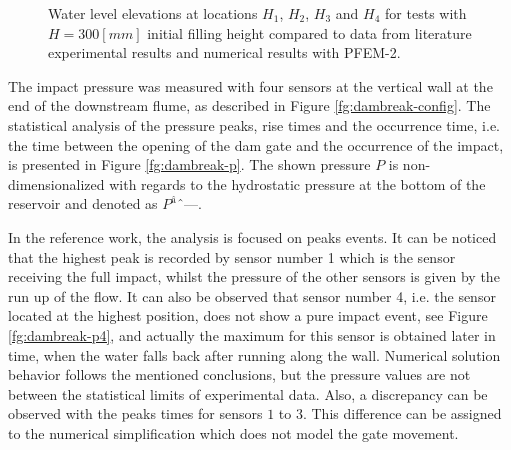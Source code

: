 \begin{figure}[h]
{    }
   \caption{Water level elevations at locations $H_1$, $H_2$, $H_3$ and $H_4$ for tests with $H=300[mm]$ initial filling height compared to data from literature experimental results\cite{Lobovsky13} and numerical results with PFEM-2.}
   \label{fg:dambreak-h}                %
\end{figure}

The impact pressure was measured with four sensors at the vertical wall at the end of the downstream flume, as described in Figure \ref{fg:dambreak-config}. The statistical analysis of the pressure peaks, rise times and the occurrence time, i.e. the time between
the opening of the dam gate and the occurrence of the impact, is presented in Figure \ref{fg:dambreak-p}. The shown pressure $P$ is non-dimensionalized with regards to the hydrostatic pressure at the bottom of the reservoir and denoted as $P^â$.

In the reference work, the analysis is focused on peaks events. It can be noticed that the highest peak is recorded by sensor number 1 which is the sensor receiving the full impact, whilst the pressure of the other sensors is given by the run up of the flow. It can also be observed that sensor number 4, i.e. the sensor located at the highest position, does not show a pure impact event, see Figure \ref{fg:dambreak-p4}, and actually the maximum for this sensor is obtained later in time, when the water falls back after running along the wall. Numerical solution behavior follows the mentioned conclusions, but the pressure values are not between the statistical limits of experimental data. Also, a discrepancy can be observed with the peaks times for sensors $1$ to $3$. This difference can be assigned to the numerical simplification which does not model the gate movement.


